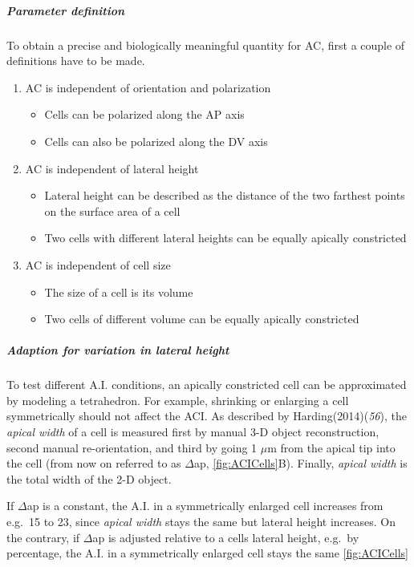 \documentclass[11pt,singlespacinge,twoside]{reedthesis} %
\providecommand{\tightlist}{%
  \setlength{\itemsep}{0pt}\setlength{\parskip}{0pt}}
\begin{document}
\hypertarget{ACI-param}{%
\subparagraph{Parameter definition}\label{ACI-param}}

To obtain a precise and biologically meaningful quantity for AC, first a couple of definitions have to be made.
\begin{enumerate}
\def\labelenumi{\arabic{enumi}.}
\tightlist
\item
  AC is independent of orientation and polarization
  \begin{itemize}
  \tightlist
  \item
    Cells can be polarized along the AP axis
  \item
    Cells can also be polarized along the DV axis
  \end{itemize}
\item
  AC is independent of lateral height
  \begin{itemize}
  \tightlist
  \item
    Lateral height can be described as the distance of the two farthest points on the surface area of a cell
  \item
    Two cells with different lateral heights can be equally apically constricted
  \end{itemize}
\item
  AC is independent of cell size
  \begin{itemize}
  \tightlist
  \item
    The size of a cell is its volume
  \item
    Two cells of different volume can be equally apically constricted
  \end{itemize}
\end{enumerate}
\hypertarget{ACI-lat}{%
\subparagraph{Adaption for variation in lateral height}\label{ACI-lat}}

To test different A.I. conditions, an apically constricted cell can be approximated by modeling a tetrahedron. For example, shrinking or enlarging a cell symmetrically should not affect the ACI. As described by Harding(2014)(\emph{56}), the \emph{apical width} of a cell is measured first by manual 3-D object reconstruction, second manual re-orientation, and third by going 1 \(\mu\)m from the apical tip into the cell (from now on referred to as \(\Delta\)ap, \ref{fig:ACICells}B). Finally, \emph{apical width} is the total width of the 2-D object.

If \(\Delta\)ap is a constant, the A.I. in a symmetrically enlarged cell increases from e.g.~15 to 23, since \emph{apical width} stays the same but lateral height increases. On the contrary, if \(\Delta\)ap is adjusted relative to a cells lateral height, e.g.~by percentage, the A.I. in a symmetrically enlarged cell stays the same \ref{fig:ACICells}
\end{document}

